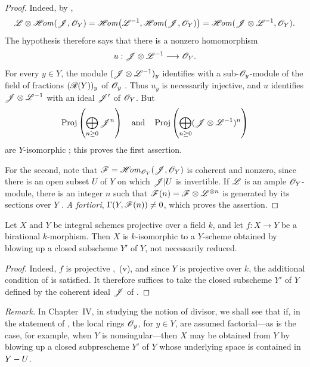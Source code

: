 \begin{proof}
Indeed, by ,
\[
  \mathscr{L}\otimes\mathscr{H}\!\mathit{om}(\mathscr{J},\mathscr{O}_Y)
  =\mathscr{H}\!\mathit{om}\bigl(\mathscr{L}^{-1},\mathscr{H}\!\mathit{om}(\mathscr{J},\mathscr{O}_Y)\bigr)
  =\mathscr{H}\!\mathit{om}(\mathscr{J}\otimes\mathscr{L}^{-1},\mathscr{O}_Y).
\]
The hypothesis therefore says that there is a nonzero homomorphism
\[
  u:\mathscr{J}\otimes\mathscr{L}^{-1}\longrightarrow\mathscr{O}_Y.
\]
For every $y\in Y$, the module $(\mathscr{J}\otimes\mathscr{L}^{-1})_y$ identifies with a sub-$\mathscr{O}_y$-module of the field of fractions $(\mathscr{R}(Y))_y$ of $\mathscr{O}_y$ .
Thus $u_y$ is necessarily injective, and $u$ identifies $\mathscr{J}\otimes\mathscr{L}^{-1}$ with an ideal $\mathscr{J}'$ of $\mathscr{O}_Y$.
But
\[
  \operatorname{Proj}\left(\bigoplus_{n\geq0}\mathscr{J}^n\right)
  \quad\text{and}\quad
  \operatorname{Proj}\left(\bigoplus_{n\geq0}
  (\mathscr{J}\otimes\mathscr{L}^{-1})^n\right)
\]
are $Y$-isomorphic ; this proves the first assertion.

For the second, note that $\mathscr{F}=\mathscr{H}\!\mathit{om}_{\mathscr{O}_Y}(\mathscr{J},\mathscr{O}_Y)$
is coherent and nonzero, since there is an open subset $U$ of $Y$ on which $\mathscr{J}|U$ is invertible.
If $\mathscr{L}$ is an ample $\mathscr{O}_Y$-module, there is an integer $n$ such that $\mathscr{F}(n)=\mathscr{F}\otimes\mathscr{L}^{\otimes n}$
is generated by its sections over $Y$ .
\emph{A fortiori}, $\Gamma(Y,\mathscr{F}(n))\neq0$,
which proves the assertion.
\end{proof}

\begin{corollary}[2.3.7]
\label{III.2.3.7}
Let $X$ and $Y$ be integral schemes projective over a field $k$, and let $f:X\longrightarrow Y$
be a birational $k$-morphism.
Then $X$ is $k$-isomorphic to a $Y$-scheme obtained by blowing up a closed subscheme $Y'$ of $Y$, not necessarily reduced.
\end{corollary}

\begin{proof}
Indeed, $f$ is projective ,~(v), and since $Y$ is projective over $k$, the additional condition of  is satisfied.
It therefore suffices to take the closed subscheme $Y'$ of $Y$ defined by the coherent ideal $\mathscr{J}$ of .
\end{proof}

\begin{env}[2.3.8]
\label{III.2.3.8}
\emph{Remark.}
In Chapter~IV, in studying the notion of divisor, we shall see that if, in the statement of , the local rings $\mathscr{O}_y$, for $y\in Y$, are assumed factorial---as is the case, for example, when $Y$ is nonsingular---then $X$ may be obtained from $Y$ by blowing up a closed subprescheme $Y'$ of $Y$ whose underlying space is contained in $Y- U$.
\end{env}


